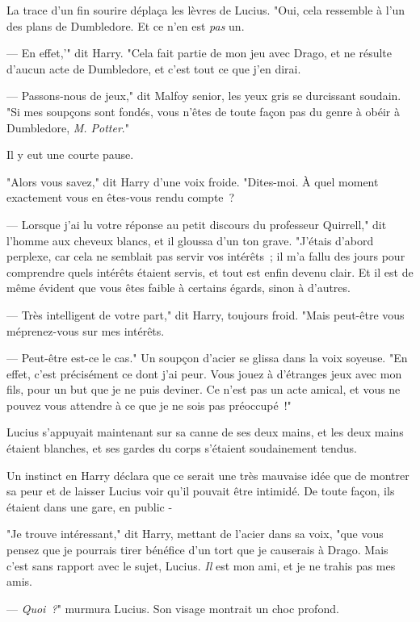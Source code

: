 La trace d'un fin sourire déplaça les lèvres de Lucius. "Oui, cela ressemble à l'un des plans de Dumbledore. Et ce n'en est \emph{pas} un.

--- En effet,'" dit Harry. "Cela fait partie de mon jeu avec Drago, et ne résulte d'aucun acte de Dumbledore, et c'est tout ce que j'en dirai.

--- Passons-nous de jeux," dit Malfoy senior, les yeux gris se durcissant soudain. "Si mes soupçons sont fondés, vous n'êtes de toute façon pas du genre à obéir à Dumbledore, \emph{M. Potter}."

Il y eut une courte pause.

"Alors vous savez," dit Harry d'une voix froide. "Dites-moi. À quel moment exactement vous en êtes-vous rendu compte~?

--- Lorsque j'ai lu votre réponse au petit discours du professeur Quirrell," dit l'homme aux cheveux blancs, et il gloussa d'un ton grave. "J'étais d'abord perplexe, car cela ne semblait pas servir vos intérêts~; il m'a fallu des jours pour comprendre quels intérêts étaient servis, et tout est enfin devenu clair. Et il est de même évident que vous êtes faible à certains égards, sinon à d'autres.

--- Très intelligent de votre part," dit Harry, toujours froid. "Mais peut-être vous méprenez-vous sur mes intérêts.

--- Peut-être est-ce le cas." Un soupçon d'acier se glissa dans la voix soyeuse. "En effet, c'est précisément ce dont j'ai peur. Vous jouez à d'étranges jeux avec mon fils, pour un but que je ne puis deviner. Ce n'est pas un acte amical, et vous ne pouvez vous attendre à ce que je ne sois pas préoccupé~!"

Lucius s'appuyait maintenant sur sa canne de ses deux mains, et les deux mains étaient blanches, et ses gardes du corps s'étaient soudainement tendus.

Un instinct en Harry déclara que ce serait une très mauvaise idée que de montrer sa peur et de laisser Lucius voir qu'il pouvait être intimidé. De toute façon, ils étaient dans une gare, en public -

"Je trouve intéressant," dit Harry, mettant de l'acier dans sa voix, "que vous pensez que je pourrais tirer bénéfice d'un tort que je causerais à Drago. Mais c'est sans rapport avec le sujet, Lucius. \emph{Il} est mon ami, et je ne trahis pas mes amis.

--- \emph{Quoi~?}" murmura Lucius. Son visage montrait un choc profond.

